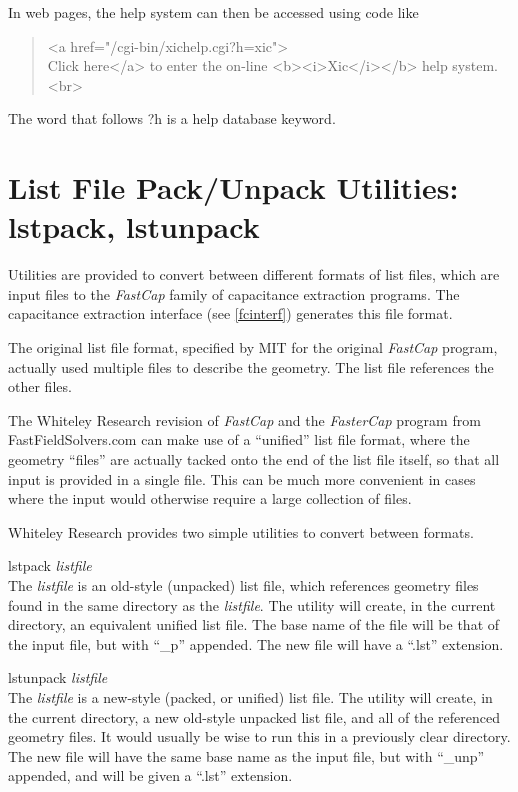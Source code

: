 In web pages, the help system can then be accessed using code like

\begin{quote} \vt
<a href="/cgi-bin/xichelp.cgi?h=xic">\\
Click here</a> to enter the on-line <b><i>Xic</i></b> help system.<br>
\end{quote}

The word that follows {\vt ?h} is a help database keyword.


\section{List File Pack/Unpack Utilities:  {\vt lstpack}, {\vt lstunpack}}

Utilities are provided to convert between different formats of list
files, which are input files to the {\it FastCap} family of
capacitance extraction programs.  The capacitance extraction interface
(see \ref{fcinterf}) generates this file format.
    
The original list file format, specified by MIT for the original {\it
FastCap} program, actually used multiple files to describe the
geometry.  The list file references the other files.

The Whiteley Research revision of {\it FastCap} and the {\it
FasterCap} program from {\vt FastFieldSolvers.com} can make use of a
``unified'' list file format, where the geometry ``files'' are
actually tacked onto the end of the list file itself, so that all
input is provided in a single file.  This can be much more convenient
in cases where the input would otherwise require a large collection of
files.

Whiteley Research provides two simple utilities to convert between
formats.

\begin{description}
\item{\vt lstpack} {\it listfile}\\
The {\it listfile} is an old-style (unpacked) list file, which
references geometry files found in the same directory as the {\it
listfile}.  The utility will create, in the current directory, an
equivalent unified list file.  The base name of the file will be that
of the input file, but with ``{\vt \_p}'' appended.  The new file will
have a ``{\vt .lst}'' extension.

\item{\vt lstunpack} {\it listfile}\\
The {\it listfile} is a new-style (packed, or unified) list file.  The
utility will create, in the current directory, a new old-style
unpacked list file, and all of the referenced geometry files.  It
would usually be wise to run this in a previously clear directory. 
The new file will have the same base name as the input file, but with
``{\vt \_unp}'' appended, and will be given a ``{\vt .lst}''
extension.
\end{description}


